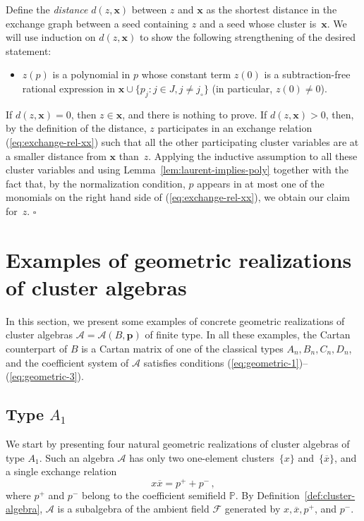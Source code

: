 \documentclass[letterpaper]{amsart}
\numberwithin{equation}{section}
\theoremstyle{definition}
\def\endproof{\hfill$\square$\medskip}
\def\AA{\mathcal{A}}
\def\PP{\mathbb{P}}
\def\xx{\mathbf{x}}
\def\pp{\mathbf{p}}
\def\FFcal{\mathcal{F}}
\begin{document}
Define the \emph{distance} $d(z,\xx)$ 
between $z$ and $\xx$ as the shortest distance 
in the exchange graph between a seed containing $z$ and a seed whose cluster 
is~$\xx$. 
We will use induction on $d(z,\xx)$ to show the following 
strengthening of the desired statement: 
\begin{itemize} 
 
\item 
$z(p)$ is a polynomial in $p$ 
whose constant term $z(0)$ is a subtraction-free rational 
expression in $\xx \cup \{p_j: j \in J, j \neq j_\circ\}$ 
(in particular, $z(0)\neq 0$). 
\end{itemize} 
 
If $d(z,\xx) = 0$, then $z \in \xx$, and there is nothing to prove. 
If $d(z,\xx) > 0$, then, by the definition of the distance, $z$ 
participates in an exchange relation (\ref{eq:exchange-rel-xx}) 
such that all the other participating cluster variables are at a 
smaller distance from $\xx$ than~$z$. 
Applying the inductive assumption to all these cluster variables 
and using Lemma~\ref{lem:laurent-implies-poly} together with 
the fact that, by the normalization condition, $p$ appears in at most 
one of the monomials on the right hand side of 
(\ref{eq:exchange-rel-xx}), we obtain our claim for~$z$. 
\endproof 
 
 
 
 
 
 
 
\section{Examples of geometric realizations of cluster algebras} 
\label{sec:geometric-realization} 
In this section, we present some examples of concrete 
geometric realizations of cluster algebras $\AA = \AA(B,\pp)$ of finite type. 
In all these examples, the Cartan counterpart of $B$ 
is a Cartan matrix of one of the classical types 
$A_n, B_n, C_n, D_n$, and the coefficient system of $\AA$ 
satisfies conditions (\ref{eq:geometric-1})--(\ref{eq:geometric-3}). 
 
 
\subsection{Type $A_1$} 
\label{sec:ca-type-A1} 
We start by presenting four natural geometric realizations of 
cluster algebras of type $A_1$. 
Such an algebra $\AA$ has only two one-element clusters~$\{x\}$ 
and~$\{\overline x\}$, and a single exchange relation 
\begin{equation} 
\label{eq:exchange-A1} 
x \overline x = p^+ + p^- \, , 
\end{equation} 
where $p^+$ and $p^-$ belong to the coefficient semifield $\PP$. 
By Definition~\ref{def:cluster-algebra}, $\AA$ is a subalgebra 
of the ambient field $\FFcal$ generated by $x, \overline x, p^+$, 
and $p^-$. 
 
\end{document}

